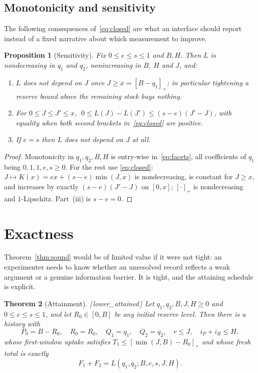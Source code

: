 \documentclass[11pt]{article}
\theoremstyle{plain}
\newtheorem{theorem}{Theorem}[section]
\newtheorem{proposition}[theorem]{Proposition}
\theoremstyle{definition}
\theoremstyle{remark}
\newcommand{\pos}[1]{\left[#1\right]_{+}}
\newcommand{\leanref}[1]{{\normalfont\sffamily\footnotesize[\,#1\,]}}
\newcommand{\Lc}{L}
\begin{document}
\subsection{Monotonicity and sensitivity}

The following consequences of~\eqref{eq:closed} are what an interface should
report instead of a fixed narrative about which measurement to improve.

\begin{proposition}[Sensitivity]\label{prop:sens}
Fix $0\le e\le s\le1$ and $B,H$. Then $\Lc$ is nondecreasing in $q_1$ and
$q_2$, nonincreasing in $B$, $H$ and $J$, and:
\begin{enumerate}
\item[(i)] $\Lc$ does not depend on $J$ once $J\ge x=\pos{B-q_1}$; in
particular tightening a reserve bound above the remaining stock buys nothing.
\item[(ii)] For $0\le J\le J'\le x$,
$\;0\le \Lc(J)-\Lc(J')\le (s-e)(J'-J)$, with equality when both second
brackets in~\eqref{eq:closed} are positive.
\item[(iii)] If $e=s$ then $\Lc$ does not depend on $J$ at all.
\end{enumerate}
\end{proposition}

\begin{proof}
Monotonicity in $q_1,q_2,B,H$ is entry-wise in~\eqref{eq:facets}, all
coefficients of $q_1$ being $0,1,1,e,s\ge0$. For the rest use
\eqref{eq:closed}: $J\mapsto K(x)=ex+(s-e)\min(J,x)$ is nondecreasing, is
constant for $J\ge x$, and increases by exactly $(s-e)(J'-J)$ on $[0,x]$;
$\pos{\cdot}$ is nondecreasing and $1$-Lipschitz. Part~(iii) is $s-e=0$.
\end{proof}

\section{Exactness}\label{sec:attain}

Theorem~\ref{thm:sound} would be of limited value if it were not tight: an
experimenter needs to know whether an unresolved record reflects a weak
argument or a genuine information barrier. It is tight, and the attaining
schedule is explicit.

\begin{theorem}[Attainment]\label{thm:attain}
\leanref{lower\_attained}
Let $q_1,q_2,B,J,H\ge0$ and $0\le e\le s\le1$, and let $R_0\in[0,B]$ be any
initial reserve level. Then there is a history with
\[
 P_0=B-R_0,\quad R_0=R_0,\quad Q_1=q_1,\quad Q_2=q_2,\quad
 r\le J,\quad i_P+i_R\le H,
\]
whose first-window uptake satisfies $T_1\le\pos{\min(J,B)-R_0}$ and whose
fresh total is exactly
\[
 F_1+F_2=\Lc(q_1,q_2;B,e,s,J,H).
\]
\end{theorem}
\end{document}
